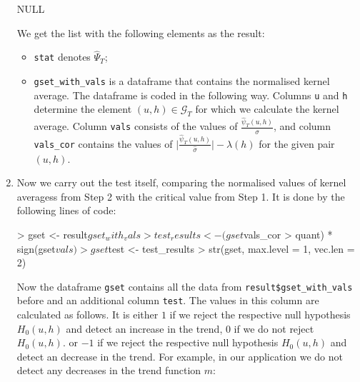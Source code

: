 \documentclass[a4paper]{scrartcl}
\begin{document}
\begin{enumerate}[label=\textit{Step \arabic*.}, leftmargin=1.45cm]
\begin{Schunk}
\begin{Soutput}
NULL
\end{Soutput}
\end{Schunk}
We get the list with the following elements as the result:
\begin{itemize}
\item \verb|stat| denotes $\widehat{\Psi}_{T}$;
\item \verb|gset_with_vals| is a dataframe that contains the normalised kernel average. The dataframe is coded in the following way. Columns \verb|u| and \verb|h| determine the element $(u, h) \in {}_T$ for which we calculate the kernel average. Column \verb|vals| consists of the values of
$$, and column \verb|vals_cor| contains the values of $\Big|\Big| - \lambda(h)$ for the given pair $(u, h)$.
\end{itemize}

\item Now we carry out the test itself, comparing the normalised values of kernel averagess from Step 2 with the critical value from Step 1. It is done by the following lines of code:
\begin{Schunk}
\begin{Sinput}
> gset         <- result$gset_with_vals
> test_results <- (gset$vals_cor > quant) * sign(gset$vals)
> gset$test    <- test_results
> str(gset, max.level = 1, vec.len = 2)
\end{Sinput}
\end{Schunk}

Now the dataframe \verb|gset| contains all the data from \linebreak \verb|result$gset_with_vals| before and an additional column \verb|test|. The values in this column are calculated as follows. It is either $1$ if we reject the respective null hypothesis $H_0(u, h)$ and detect an increase in the trend, $0$ if we do not reject $H_0(u, h)$. or $-1$ if we reject the respective null hypothesis $H_0(u, h)$ and detect an decrease in the trend. For example, in our application we do not detect any decreases in the trend function $m$:


\end{enumerate}
\end{document}
